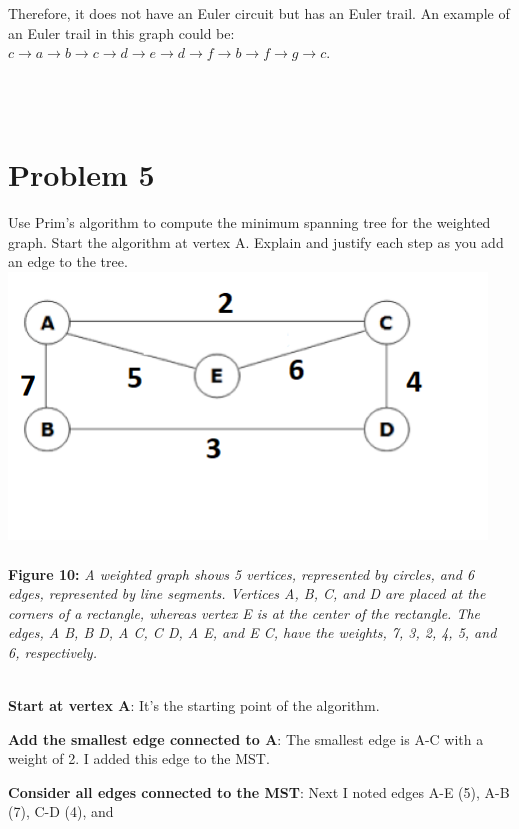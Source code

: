 \documentclass{amsart}
\theoremstyle{definition}
\theoremstyle{Exercise}
\theoremstyle{remark}
\theoremstyle{rule}
\numberwithin{equation}{section}
\begin{document}
\begin{enumerate}[label=(\alph{*})]
			Therefore, it does not have an Euler circuit but has an Euler trail. An
			example of an Euler trail in this graph could be: $c \rightarrow a \rightarrow
			b \rightarrow c \rightarrow d \rightarrow e \rightarrow d \rightarrow f \rightarrow
			b \rightarrow f \rightarrow g \rightarrow c$. \\\\
	\end{enumerate}
	\newpage
	~\\
	\section*{Problem 5}
	Use Prim's algorithm to compute the minimum spanning tree for the weighted
	graph. Start the algorithm at vertex A. Explain and justify each step as you
	add an edge to the tree. \\
	\includegraphics[width=5in]{prim}
	\\\\
	{\color{blue} {\bf Figure 10:} \emph{A weighted graph shows 5 vertices, represented by circles, and 6 edges, represented by line segments. Vertices A, B, C, and D are placed at the corners of a rectangle, whereas vertex E is at the center of the rectangle. The edges, A B, B D, A C, C D, A E, and E C, have the weights, 7, 3, 2, 4, 5, and 6, respectively. } }
	\\\\
	\item \textbf{Start at vertex A}: It's the starting point of the algorithm.
	\item \textbf{Add the smallest edge connected to A}: The smallest edge is A-C
	with a weight of 2. I added this edge to the MST. \item \textbf{Consider all
	edges connected to the MST}: Next I noted edges A-E (5), A-B (7), C-D (4), and
\end{document}
